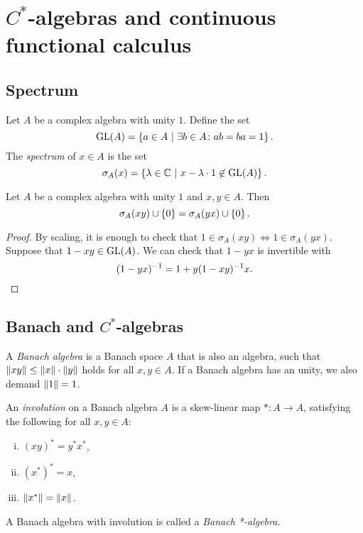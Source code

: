 \section{\texorpdfstring{$C^*$}{C*}-algebras and continuous functional calculus}

\subsection{Spectrum}

\begin{definicija}
Let $A$ be a complex algebra with unity $1$. Define the set
\[
\operatorname{GL}(A) = \left\{a \in A~\middle\vert~\exists b \in A \colon ab = ba = 1\right\}.
\]
The \emph{spectrum} of $x \in A$ is the set
\[
\sigma_A(x) =
\left\{\lambda \in \mathbb{C}~\middle\vert~x - \lambda \cdot 1 \not \in \operatorname{GL}(A)\right\}.
\]
\end{definicija}

\begin{trditev}
Let $A$ be a complex algebra with unity $1$ and $x, y \in A$. Then
\[
\sigma_A(xy) \cup \left\{0\right\} = \sigma_A(yx) \cup \left\{0\right\}.
\]
\end{trditev}

\begin{proof}
By scaling, it is enough to check that
$1 \in \sigma_A(xy) \iff 1 \in \sigma_A(yx)$. Suppose that
$1 - xy \in \operatorname{GL}(A)$. We can check that $1 - yx$ is invertible with
\[
(1-yx)^{-1} = 1 + y (1 - xy)^{-1} x. \qedhere
\]
\end{proof}

\newpage

\subsection{Banach and \texorpdfstring{$C^*$}{C*}-algebras}

\begin{definicija}
A \emph{Banach algebra} is a Banach space $A$
that is also an algebra, such that
$\left\lVert xy\right\rVert \leq \left\lVert x\right\rVert \cdot \left\lVert y\right\rVert$ holds for all
$x, y \in A$. If a Banach algebra has an unity, we also demand
$\left\lVert 1\right\rVert = 1$.
\end{definicija}

\begin{definicija}
An \emph{involution} on a Banach algebra $A$ is a
skew-linear map $* \colon A \to A$, satisfying the following for
all $x, y \in A$:

\begin{enumerate}[i)]
\item $(xy)^* = y^* x^*$,
\item $(x^*)^* = x$,
\item $\left\lVert x^*\right\rVert = \left\lVert x\right\rVert$.
\end{enumerate}

A Banach algebra with involution is called a
\emph{Banach *-algebra}.
\end{definicija}


